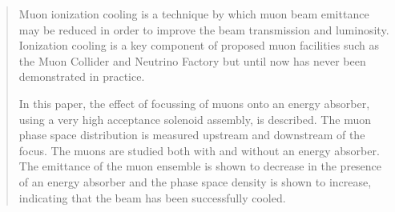 \begin{quotation}

\noindent
Muon ionization cooling is a technique by which muon beam emittance may be reduced in
order to improve the beam transmission and luminosity. Ionization cooling is a key
component of proposed muon facilities such as the Muon Collider and Neutrino Factory
but until now has never been demonstrated in practice. 

In this paper, the effect of focussing of muons onto an energy absorber, using
a very high acceptance solenoid assembly, is described. The muon phase space distribution is
measured upstream and downstream of the focus. The muons are studied both with and without
an energy absorber. The emittance of the muon ensemble is shown to decrease in the presence of
an energy absorber and the phase space density is shown to increase, indicating that the 
beam has been successfully cooled.
\end{quotation}


